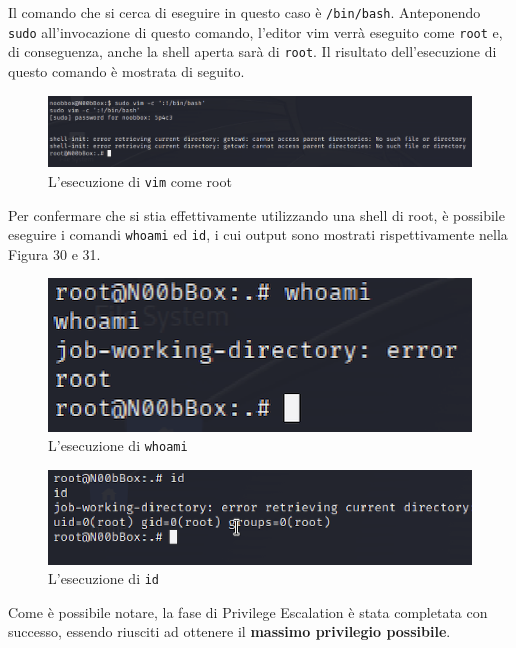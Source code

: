 \documentclass[a4paper, 12pt, oneside]{article}
\begin{document}
Il comando che si cerca di eseguire in questo caso è \texttt{/bin/bash}. Anteponendo \texttt{sudo} all'invocazione di questo comando, l'editor vim verrà eseguito come \texttt{root} e, di conseguenza, anche la shell aperta sarà di \texttt{root}. Il risultato dell'esecuzione di questo comando è mostrata di seguito.

\begin{figure}[h!]
    \centering
    \includegraphics[width=\textwidth]{img/vim.png}
    \caption{L'esecuzione di \texttt{vim} come root}
\end{figure}

Per confermare che si stia effettivamente utilizzando una shell di root, è possibile eseguire i comandi \texttt{whoami} ed \texttt{id}, i cui output sono mostrati rispettivamente nella Figura 30 e 31.

\begin{figure}[h!]
    \centering
    \includegraphics[width=\textwidth]{img/whoami.png}
    \caption{L'esecuzione di \texttt{whoami}}
\end{figure}

\begin{figure}[h!]
    \centering
    \includegraphics[width=\textwidth]{img/id.png}
    \caption{L'esecuzione di \texttt{id}}
\end{figure}

Come è possibile notare, la fase di Privilege Escalation è stata completata con successo, essendo riusciti ad ottenere il \textbf{massimo privilegio possibile}.
\end{document}
